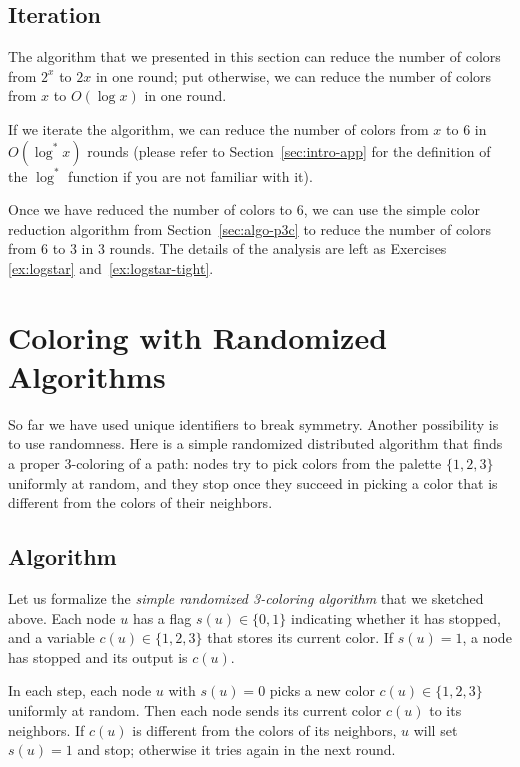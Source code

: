 \subsection{Iteration}

The algorithm that we presented in this section can reduce the number of colors from $2^x$ to $2x$ in one round; put otherwise, we can reduce the number of colors from $x$ to $O(\log x)$ in one round.

If we iterate the algorithm, we can reduce the number of colors from $x$ to $6$ in $O(\log^* x)$ rounds (please refer to Section~\ref{sec:intro-app} for the definition of the $\log^*$ function if you are not familiar with it).

Once we have reduced the number of colors to $6$, we can use the simple color reduction algorithm from Section~\ref{sec:algo-p3c} to reduce the number of colors from $6$ to $3$ in $3$ rounds. The details of the analysis are left as Exercises \ref{ex:logstar} and~\ref{ex:logstar-tight}.


\section{Coloring with Randomized Algorithms}\label{sec:algo-p3crand}

So far we have used unique identifiers to break symmetry. Another possibility is to use randomness. Here is a simple randomized distributed algorithm that finds a proper $3$-coloring of a path: nodes try to pick colors from the palette $\{1,2,3\}$ uniformly at random, and they stop once they succeed in picking a color that is different from the colors of their neighbors.


\subsection{Algorithm}

Let us formalize the \emph{simple randomized 3-coloring algorithm} that we sketched above. Each node $u$ has a flag $s(u) \in \{0,1\}$ indicating whether it has stopped, and a variable $c(u) \in \{1,2,3\}$ that stores its current color. If $s(u) = 1$, a node has stopped and its output is $c(u)$.

In each step, each node $u$ with $s(u) = 0$ picks a new color $c(u) \in \{1,2,3\}$ uniformly at random. Then each node sends its current color $c(u)$ to its neighbors. If $c(u)$ is different from the colors of its neighbors, $u$ will set $s(u) = 1$ and stop; otherwise it tries again in the next round.


